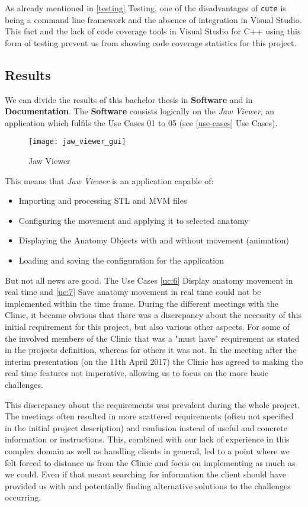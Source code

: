 \noindent As already mentioned in \ref{testing} Testing, one of the disadvantages of \verb|cute| is being a command line framework and the absence of integration in Visual Studio. This fact and the lack of code coverage tools in Visual Studio for C++ using this form of testing prevent us from showing code coverage statistics for this project.


\subsection{Results}

We can divide the results of this bachelor thesis in \textbf{Software} and in \textbf{Documentation}. 
The \textbf{Software} consists logically on the \emph{Jaw Viewer}, an application which fulfils the Use Cases 01 to 05 (see \ref{use-cases} Use Cases). 

\begin{figure}[h!]
	\centering
	\texttt{[image: jaw\_viewer\_gui]}
	\caption{Jaw Viewer}
\end{figure}

\noindent This means that \emph{Jaw Viewer} is an application capable of:
\begin{itemize}
	\item Importing and processing \gls{STL} and \gls{MVM} files
	\item Configuring the movement and applying it to selected \gls{anatomy}
	\item Displaying the Anatomy Objects with and without movement (animation)
	\item Loading and saving the configuration for the application
\end{itemize}

\noindent But not all news are good. The Use Cases \ref{uc:6} Display anatomy movement in real time and \ref{uc:7} Save anatomy movement in real time could not be implemented within the time frame. During the different meetings with the Clinic, it became obvious that there was a discrepancy about the necessity of this initial requirement for this project, but also various other aspects. For some of the involved members of the Clinic that was a "must have" requirement as stated in the projects definition, whereas for others it was not. In the meeting after the interim presentation (on the 11th April 2017) the Clinic has agreed to making the real time features not imperative, allowing us to focus on the more basic challenges.

This discrepancy about the requirements was prevalent during the whole project. The meetings often resulted in more scattered requirements (often not specified in the initial project description) and confusion instead of useful and concrete information or instructions. This, combined with our lack of experience in this complex domain as well as handling clients in general, led to a point where we felt forced to distance us from the Clinic and focus on implementing as much as we could. Even if that meant searching for information the client should have provided us with and potentially finding alternative solutions to the challenges occurring.

